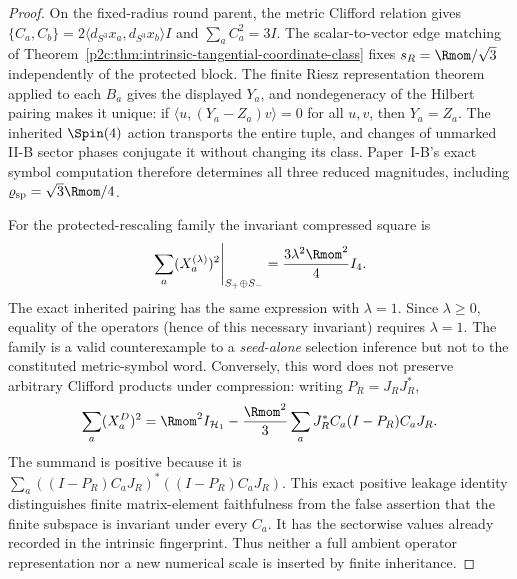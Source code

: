\documentclass[12pt,a4paper]{article}
\begin{document}
\begin{proof}
On the fixed-radius round parent, the metric Clifford relation gives
\(\{C_a,C_b\}=2\langle d_{S^3}x_a,d_{S^3}x_b\rangle I\) and
\(\sum_a C_a^2=3I\).  The scalar-to-vector edge matching of
Theorem~\ref{p2c:thm:intrinsic-tangential-coordinate-class} fixes
\(s_R=\Rmom/\sqrt3\) independently of the protected block.  The finite
Riesz representation theorem applied to each \(B_a\) gives the displayed
\(Y_a\), and nondegeneracy of the Hilbert pairing makes it unique:
if \(\langle u,(Y_a-Z_a)v\rangle=0\) for all \(u,v\), then \(Y_a=Z_a\).
The inherited \(\Spin(4)\) action transports the entire tuple, and changes
of unmarked II-B sector phases conjugate it without changing its class.
Paper~I-B's exact symbol computation therefore determines all three reduced
magnitudes, including \(\varrho_{\rm sp}=\sqrt3\Rmom/4\).

For the protected-rescaling family the invariant compressed square is
\[
 \left.\sum_a(X_a^{(\lambda)})^2\right|_{S_+\oplus S_-}
 =\frac{3\lambda^2\Rmom^2}{4}I_4.
\]
The exact inherited pairing has the same expression with \(\lambda=1\).
Since \(\lambda\geq0\), equality of the operators (hence of this necessary
invariant) requires \(\lambda=1\).  The family is a valid counterexample to
a \emph{seed-alone} selection inference but not to the constituted
metric-symbol word.  Conversely, this word does not preserve arbitrary
Clifford products under compression: writing \(P_R=J_RJ_R^*\),
\[
 \sum_a(X_a^D)^2
 =\Rmom^2 I_{\mathcal H_1}
 -\frac{\Rmom^2}{3}\sum_aJ_R^*C_a(I-P_R)C_aJ_R.
\]
The summand is positive because it is
\(\sum_a((I-P_R)C_aJ_R)^*((I-P_R)C_aJ_R)\).
This exact positive leakage identity distinguishes finite matrix-element
faithfulness from the false assertion that the finite subspace is invariant
under every \(C_a\).  It has the sectorwise values already recorded in the
intrinsic fingerprint.  Thus neither a full ambient operator representation
nor a new numerical scale is inserted by finite inheritance.
\end{proof}
\end{document}
